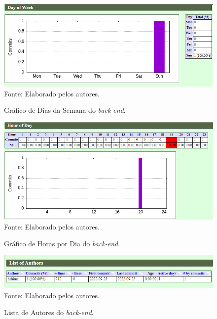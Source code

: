 \documentclass[
    12pt,               %
    openright,          %
    oneside,
    a4paper,            %
    BIBLATEX,           %
    TODO,               %
    english,            %
    brazil              %
    ]{ifsp-spo-inf-ctds}
\begin{document}
            \begin{figure}[H]
                \centering
                \caption{Gráfico de Dias da Semana do \emph{back-end}.}
                \includegraphics[width=1 \textwidth]{Gitstats/back-end/DiasBack.png}
                {\footnotesize Fonte: Elaborado pelos autores.}
                \label{fig:diasBack}
            \end{figure}

            \begin{figure}[H]
                \centering
                \caption{Gráfico de Horas por Dia do \emph{back-end}.}
                \includegraphics[width=1 \textwidth]{Gitstats/back-end/HorasBack.png}
                {\footnotesize Fonte: Elaborado pelos autores.}
                \label{fig:HorasBack}
            \end{figure} 

            \begin{figure}[H]
                \centering
                \caption{Lista de Autores do \emph{back-end}.}
                \includegraphics[width=1 \textwidth]{Gitstats/back-end/AutorBack.png}
                {\footnotesize Fonte: Elaborado pelos autores.}
                \label{fig:AutorBack}
            \end{figure}
\end{document}
